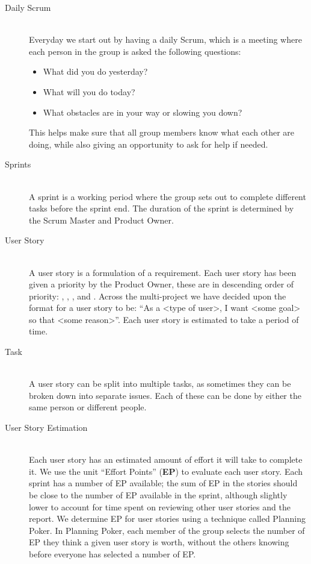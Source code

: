\begin{description}
	\item[Daily Scrum] \hfill \\
	Everyday we start out by having a daily Scrum, which is a meeting where each person in the group is asked the following questions:
		\begin{itemize}
		    \item What did you do yesterday? 
			\item What will you do today?
			\item What obstacles are in your way or slowing you down?		
		\end{itemize}
		This helps make sure that all group members know what each other are doing, while also giving an opportunity to ask for help if needed.
	\item[Sprints] \hfill \\
	A sprint is a working period where the group sets out to complete different tasks before the sprint end. 
	The duration of the sprint is determined by the Scrum Master and Product Owner. 
	\item[User Story] \hfill \\
	A user story is a formulation of a requirement. 
	Each user story has been given a priority by the Product Owner, these are in descending order of priority: \pblocking, \phigh, \pnormal, \plow and \pwish. 
	Across the multi-project we have decided upon the format for a user story to be: ``As a <type of user>, I want <some goal> so that <some reason>''.
	Each user story is estimated to take a period of time.
	\item[Task] \hfill \\
	A user story can be split into multiple tasks, as sometimes they can be broken down into separate issues.
	Each of these can be done by either the same person or different people. 
	\item[User Story Estimation] \hfill \\
	Each user story has an estimated amount of effort it will take to complete it. 
	We use the unit ``Effort Points'' (\textbf{EP}) to evaluate each user story.
	Each sprint has a number of EP available; the sum of EP in the stories should be close to the number of EP available in the sprint, although slightly lower to account for time spent on reviewing other user stories and the report. 
	We determine EP for user stories using a technique called Planning Poker.
	In Planning Poker, each member of the group selects the number of EP they think a given user story is worth, without the others knowing before everyone has selected a number of EP.

\end{description}
